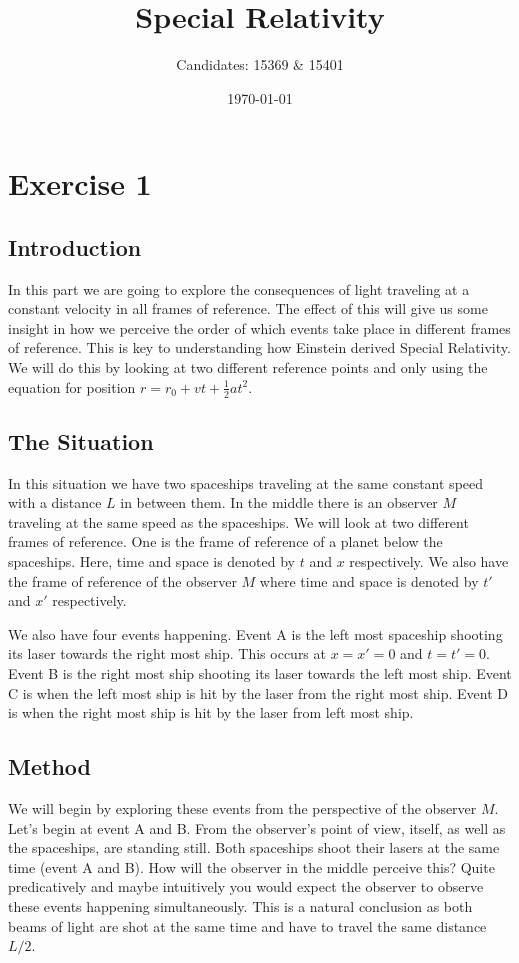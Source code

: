 \documentclass[reprint,english,notitlepage]{revtex4-2}
\begin{document}
\title{Special Relativity}
\author{Candidates: 15369 \& 15401}
\date{\today}


\maketitle

\section{Exercise 1}\label{ex: 1}

  \subsection{Introduction}
  In this part we are going to explore the consequences of light traveling at a constant velocity in all frames of reference. The effect of this will give us some insight in how we perceive the order of which events take place in different frames of reference. This is key to understanding how Einstein derived Special Relativity. We will do this by looking at two different reference points and only using the equation for position $ r = r_0 + vt + \frac{1}{2} at ^{2} $. 

  \subsection{The Situation}
  In this situation we have two spaceships traveling at the same constant speed with a distance $ L $ in between them. In the middle there is an observer $ M $ traveling at the same speed as the spaceships. We will look at two different frames of reference. One is the frame of reference of a planet below the spaceships. Here, time and space is denoted by $ t $ and $ x $ respectively. We also have the frame of reference of the observer $ M $ where time and space is denoted by $ t' $ and $ x' $ respectively. 
  
  We also have four events happening. Event A is the left most spaceship shooting its laser towards the right most ship. This occurs at $  x = x' = 0 $ and $ t = t' = 0 $. Event B is the right most ship shooting its laser towards the left most ship. Event C is when the left most ship is hit by the laser from the right most ship. Event D is when the right most ship is hit by the laser from left most ship. 
  

  \subsection{Method}
  We will begin by exploring these events from the perspective of the observer $ M $. 
  Let's begin at event A and B. From the observer's point of view, itself, as well as the spaceships, are standing still. Both spaceships shoot their lasers at the same time (event A and B). How will the observer in the middle perceive this? Quite predicatively and maybe intuitively you would expect the observer to observe these events happening simultaneously. This is a natural conclusion as both beams of light are shot at the same time and have to travel the same distance $ L / 2 $. 
  
\end{document}
